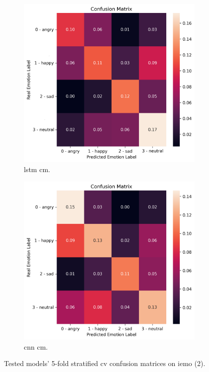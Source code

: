 \begin{figure}[H]
	\newline
	\begin{subfigure}{.5\textwidth}
		\centering
		\includegraphics[width=.9\linewidth]{figs/appendix/feature_selection/LSTMCM.png}
		\caption{\ac{lstm} \ac{cm}.}
	\end{subfigure}%
	\begin{subfigure}{.5\textwidth}
		\centering
		\includegraphics[width=.9\linewidth]{figs/appendix/feature_selection/CNNCM.png}
		\caption{\ac{cnn} \ac{cm}.}
	\end{subfigure}
	\caption{Tested models' 5-fold stratified \ac{cv} confusion matrices on \ac{iemo} (2).}
\end{figure}

